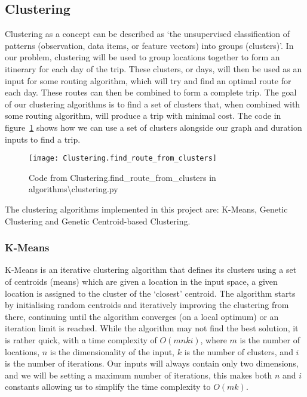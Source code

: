 \subsection{Clustering}\label{subsec:clustering}
Clustering as a concept can be described as `the unsupervised classification of patterns (observation, data items, or
feature vectors) into groups (clusters)'.
In our problem, clustering will be used to group locations together to form an itinerary for each day of the trip.
These clusters, or days, will then be used as an input for some routing algorithm, which will try and find an
optimal route for each day.
These routes can then be combined to form a complete trip.
The goal of our clustering algorithms is to find a set of clusters that, when combined with some routing algorithm,
will produce a trip with minimal cost.
The code in figure~\ref{fig:Clustering.find_route_from_clusters} shows how we can use a set of clusters alongside our
graph and duration inputs to find a trip.
\begin{figure}[H]
    \centering
    \texttt{[image: Clustering.find\_route\_from\_clusters]}
    \caption{Code from Clustering.find\_route\_from\_clusters in algorithms\textbackslash clustering.py}
    \label{fig:Clustering.find_route_from_clusters}
\end{figure}

\noindent
The clustering algorithms implemented in this project are: K-Means, Genetic Clustering and Genetic Centroid-based
Clustering.

\subsubsection{K-Means}\label{subsubsec:k-means}
K-Means is an iterative clustering algorithm that defines its clusters using a set of centroids (means) which are
given a location in the input space, a given location is assigned to the cluster of the `closest' centroid.
The algorithm starts by initialising random centroids and iteratively improving the clustering from there, continuing
until the algorithm converges (on a local optimum) or an iteration limit is reached.
While the algorithm may not find the best solution, it is rather quick, with a time complexity of $O(m n k i)$,
where $m$ is the number of locations, $n$ is the dimensionality of the input, $k$ is the number of clusters,
and $i$ is the number of iterations.
Our inputs will always contain only two dimensions, and we will be setting a maximum number of iterations, this
makes both $n$ and $i$ constants allowing us to simplify the time complexity to $O(mk)$.\\

